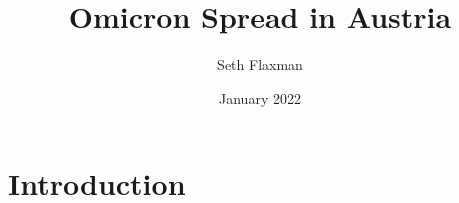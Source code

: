 \documentclass{article}
\title{Omicron Spread in Austria}
\author{Seth Flaxman}
\date{January 2022}
\begin{document}
\maketitle

\section{Introduction}
\end{document}
